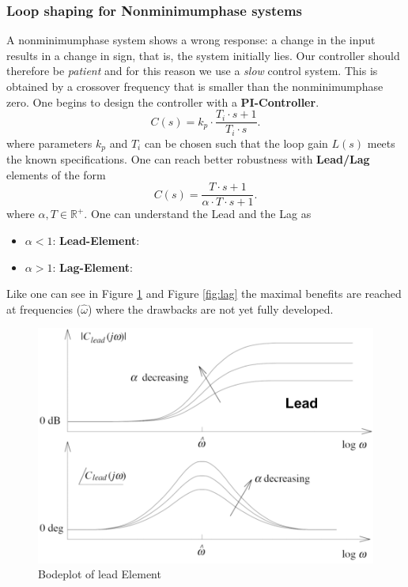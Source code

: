 \documentclass[a4paper,12 pt]{article}
\numberwithin{equation}{section}
\theoremstyle{definition}
\theoremstyle{remark}
\theoremstyle{definition}
\theoremstyle{definition}
\theoremstyle{definition}
\theoremstyle{remark}
\begin{document}
\subsubsection{Loop shaping for Nonminimumphase systems}
A nonminimumphase system shows a wrong response: a change in the input results in a change in sign, that is, the system initially lies. Our controller should therefore be \textit{patient} and for this reason we use a \textit{slow} control system. This is obtained by a crossover frequency that is smaller than the nonminimumphase zero.
One begins to design the controller with a \textbf{PI-Controller}.
\begin{equation}
C(s)=k_p\cdot \frac{T_i\cdot s+1}{T_i\cdot s}.
\end{equation}
where parameters $k_p$ and $T_i$ can be chosen such that the loop gain $L(s)$ meets the known specifications. One can reach better robustness with \textbf{Lead/Lag} elements of the form
\begin{equation}
C(s)=\frac{T\cdot s+1}{\alpha \cdot T\cdot s+1}.
\end{equation}
where $\alpha,T \in \mathbb{R}^+.$ One can understand the Lead and the Lag as
\begin{itemize}
\item $\alpha<1$: \textbf{Lead-Element}: 
\item $\alpha>1$: \textbf{Lag-Element}: 
\end{itemize}
Like one can see in Figure \ref{fig:lead} and Figure \ref{fig:lag} the maximal benefits are reached at frequencies ($\hat{\omega}$) where the drawbacks are not yet fully developed.

\begin{figure}[h!]
\begin{center}
\includegraphics[width=0.65\columnwidth]{lead.png}
\caption{Bodeplot of lead Element}
\label{fig:lead}
\end{center}
\end{figure}
\end{document}
